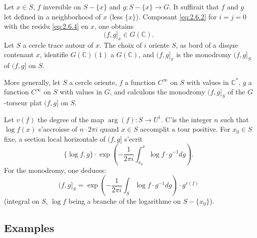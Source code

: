 \documentclass[12pt,a4paper]{article}
\theoremstyle{plain}
\theoremstyle{definition}
\theoremstyle{remark}
\newcommand{\C}{\mathbb{C}}
\begin{document}
Let $x \in S$, $f$ inversible on $S - \{x\}$ and $g : S - \{x\} \to G$. It suffirait that $f$
and $g$ let defined in a neighborhood of $x$ (less $\{x\}$). Composant \eqref{eq:2.6.2} for $i = j = 0$
with the residu \eqref{eq:2.6.4} en $x$, one obtains
\begin{equation}\label{eq:2.7.1}
(f,g]_x \in G(\C).
\end{equation}
Let $S$ a cercle trace autour of $x$. The choix of $i$ oriente $S$, as bord of a
disque contenant $x$, identifie $G(\C)(1)$ a $G(\C)$, and $(f,g]_x$ is the monodromy $(f,g]_S$
of $(f,g]$ on $S$.

More generally, let $S$ a cercle oriente, $f$ a function $C^\infty$ on $S$ with values in $\C^*$, $g$ a function $C^\infty$ on $S$ with values in $G$, and calculons the monodromy $(f,g]_S$
of the $G$-torseur plat $(f,g]$ on $S$.

Let $v(f)$ the degree of the map $\arg(f) : S \to U^1$. C'is the integer $n$ such that $\log f(x)$
s'accroisse of $n \cdot 2\pi i$ quand $x \in S$ accomplit a tour positive. For $x_0 \in S$ fixe, a section
local horizontale of $(f,g]$ s'ecrit
\[
\{\log f, g\} \cdot \exp\left(-\frac{1}{2\pi i} \int_{x_0}^x \log f \cdot g^{-1}dg\right).
\]
For the monodromy, one deduces:
\begin{equation}\label{eq:2.7.2}
(f,g]_S = \exp\left(-\frac{1}{2\pi i} \int_S \log f \cdot g^{-1}dg\right) \cdot g^{v(f)}
\end{equation}
(integral on $S$, $\log f$ being a branche of the logarithme on $S - \{x_0\}$).

\subsection{Examples}
\end{document}

